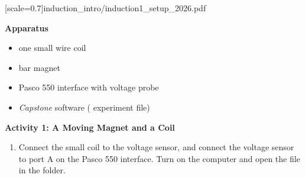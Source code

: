 \vspace{-0.3in}
[scale=0.7]{induction_intro/induction1_setup_2026.pdf}{

\vspace{+0.3in}
\textbf{Apparatus}

\begin{itemize}[nosep]
\item one small wire coil
\item bar magnet
\item Pasco 550 interface with voltage probe
\item \textit{Capstone} software ( experiment file)
\end{itemize}

\bigskip
\textbf{Activity 1: A Moving Magnet and a Coil}

\begin{enumerate}[labparts]

\item Connect the small coil to the voltage sensor, and connect the voltage sensor to port  A on the Pasco 550 interface.
Turn on the computer and open the file  in the \filename{\coursefolder} folder.

\end{enumerate}

}%


